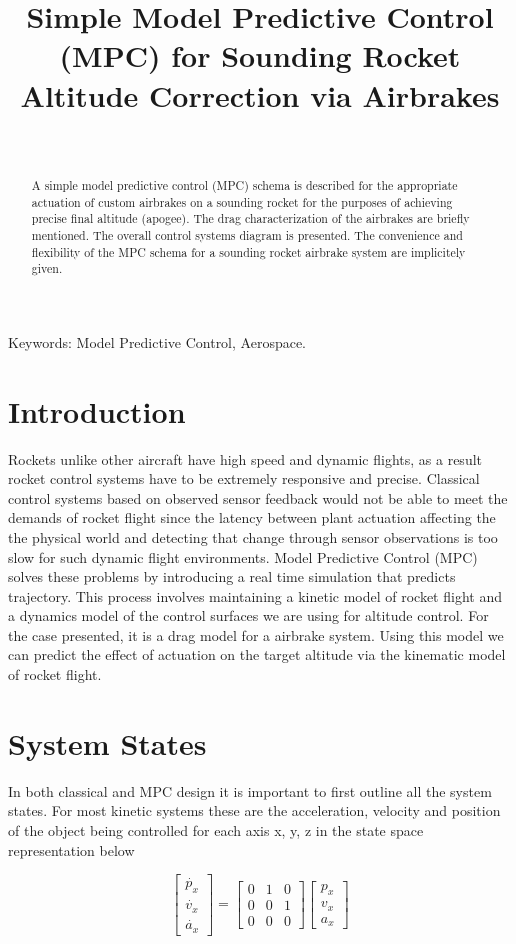 \documentclass[conference, letterpaper]{IEEEtran}
\title{Simple Model Predictive Control (MPC) for Sounding Rocket Altitude Correction via Airbrakes}
\author{ \IEEEauthorblockN{Nikhil Peri, Anthony Lin, Manit Ginoya, Paul Buzuloiu} \
\IEEEauthorblockA{uOttawa Rocketry Team \\ \{nperi104, alin102
mgino015, pbuzu025\}@uottawa.ca} }
\begin{document}
\maketitle
\begin{abstract}
A simple model predictive control (MPC) schema is described for the appropriate
actuation of custom airbrakes on a sounding rocket for the purposes of achieving
precise final altitude (apogee). The drag characterization of the airbrakes are
briefly mentioned. The overall control systems diagram is presented. The
convenience and flexibility of the MPC schema for a sounding rocket airbrake
system are implicitely given.
\end{abstract}
\vspace{5mm}
Keywords: Model Predictive Control, Aerospace.

\section{Introduction}
Rockets unlike other aircraft have high speed and dynamic flights, as a result
rocket control systems have to be extremely responsive and precise. Classical
control systems based on observed sensor feedback would not be able to meet the
demands of rocket flight since the latency between plant actuation affecting the
the physical world and detecting that change through sensor observations is too
slow for such dynamic flight environments. Model Predictive Control (MPC) solves
these problems by introducing a real time simulation that predicts trajectory.
This process involves maintaining a kinetic model of rocket flight and a
dynamics model of the control surfaces we are using for altitude control.
For the case presented, it is a drag model for a airbrake system.
Using this model we can predict the effect of actuation on the target altitude
via the kinematic model of rocket flight.

\section{System States}
In both classical and MPC design it is important to first outline all the system states.
For most kinetic systems these are the acceleration, velocity and position of the object
being controlled for each axis x, y, z in the state space representation below

\begin{equation}\label{eq:1}
\begin{bmatrix}\dot{p_x} \\ \dot{v_x} \\ \dot{a_x} \end{bmatrix} =
\begin{bmatrix} 0 & 1 & 0 \\ 0 & 0 & 1 \\ 0 & 0 & 0 \end{bmatrix}
\begin{bmatrix}p_x\\v_x\\a_x\end{bmatrix}
\end{equation}
\end{document}
